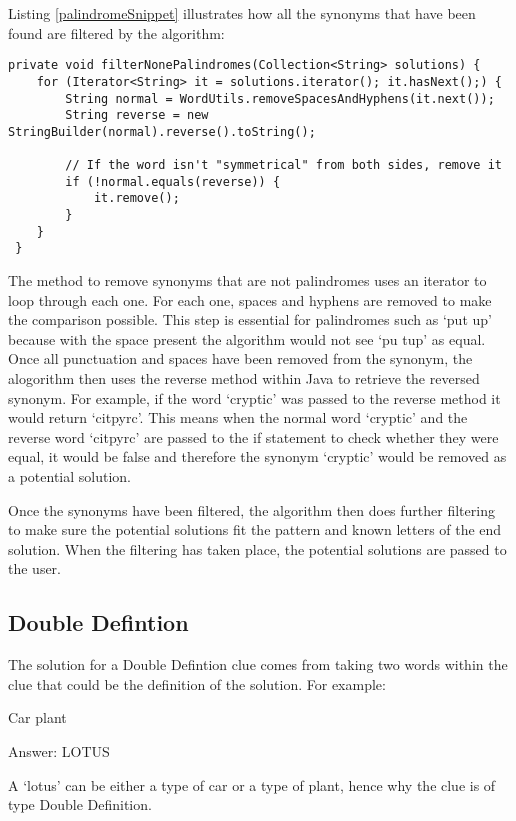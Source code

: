Listing \ref{palindromeSnippet} illustrates how all the synonyms that have
 been found are filtered by the algorithm: 

\begin{lstlisting}[caption={Checking to see if a word is a palindrome},
                   label=palindromeSnippet] 
 private void filterNonePalindromes(Collection<String> solutions) {
	for (Iterator<String> it = solutions.iterator(); it.hasNext();) {
		String normal = WordUtils.removeSpacesAndHyphens(it.next());
		String reverse = new StringBuilder(normal).reverse().toString();

		// If the word isn't "symmetrical" from both sides, remove it
		if (!normal.equals(reverse)) {
			it.remove();
		}
	}
 }
\end{lstlisting}

The method to remove synonyms that are not palindromes uses an 
iterator to loop through each one. For each one, spaces and hyphens 
are removed to make the comparison possible. This step is essential for 
palindromes such as `put up' because with the space present the 
algorithm would not see `pu tup' as equal. Once all punctuation and
spaces have been removed from the synonym, the alogorithm then 
uses the reverse method within Java to retrieve the reversed synonym. 
For example, if the word `cryptic' was passed to the reverse method 
it would return `citpyrc'. This means when the normal word `cryptic' 
and the reverse word `citpyrc' are passed to the if statement to check 
whether they were equal, it would be false and therefore the synonym 
`cryptic' would be removed as a potential solution.

Once the synonyms have been filtered, the algorithm then does further 
filtering to make sure the potential solutions fit the pattern and known 
letters of the end solution. When the filtering has taken place, the 
potential solutions are passed to the user.

\subsection{Double Defintion}

The solution for a Double Defintion clue comes from taking two 
words within the clue that could be the definition of the solution. 
For example:

Car plant

Answer: LOTUS

A `lotus' can be either a type of car or a type of plant, hence 
why the clue is of type Double Definition. 

